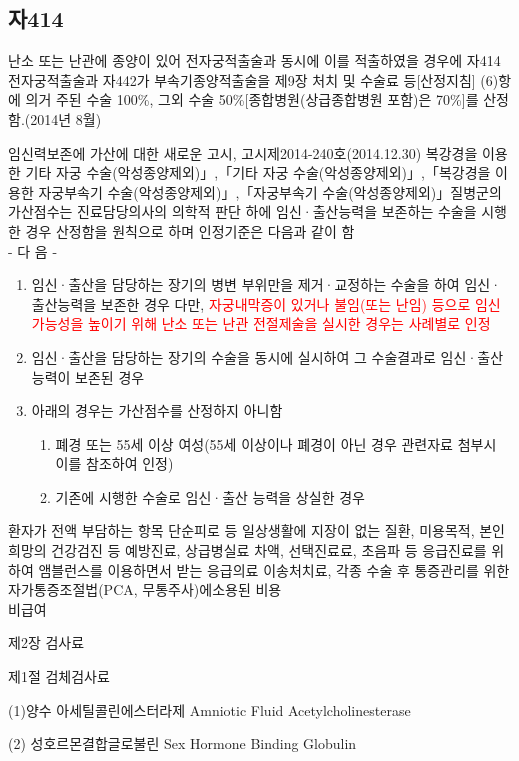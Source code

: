 \subsection{자414 }
\begin{mdframed}[linecolor=blue,middlelinewidth=2]
난소 또는 난관에 종양이 있어 전자궁적출술과 동시에 이를 적출하였을 경우에 자414 전자궁적출술과 자442가 부속기종양적출술을 제9장 처치 및 수술료 등[산정지침] (6)항에 의거 주된 수술 100\%, 그외 수술 50\%[종합병원(상급종합병원 포함)은 70\%]를 산정함.(2014년 8월)
\end{mdframed}

\begin{Cdoing}{임신력보존에 가산에 대한 새로운 고시, 고시제2014-240호(2014.12.30)}
복강경을 이용한 기타 자궁 수술(악성종양제외)」,「기타 자궁 수술(악성종양제외)」,「복강경을 이용한 자궁부속기 수술(악성종양제외)」,「자궁부속기 수술(악성종양제외)」질병군의 가산점수는 진료담당의사의 의학적 판단 하에 임신·출산능력을 보존하는 수술을 시행한 경우 산정함을 원칙으로 하며 인정기준은 다음과 같이 함 \\
- 다  음 - 
\begin{enumerate}[ 가.]\tightlist
\item  임신·출산을 담당하는 장기의 병변 부위만을 제거·교정하는 수술을 하여 임신·출산능력을 보존한 경우  다만, \textcolor{red}{자궁내막증이 있거나 불임(또는 난임) 등으로 임신가능성을 높이기 위해 난소 또는 난관 전절제술을 실시한 경우는 사례별로 인정}
\item 임신·출산을 담당하는 장기의 수술을 동시에 실시하여 그 수술결과로 임신·출산능력이 보존된 경우
\item 아래의 경우는 가산점수를 산정하지 아니함
	\begin{enumerate}[(1)]\tightlist
	\item  폐경 또는 55세 이상 여성(55세 이상이나 폐경이 아닌 경우 관련자료 첨부시 이를 참조하여 인정)
	\item  기존에 시행한 수술로 임신·출산 능력을 상실한 경우
	\end{enumerate}
\end{enumerate}	
\end{Cdoing}

\begin{hemphsentense}{환자가 전액 부담하는 항목}
단순피로 등 일상생활에 지장이 없는 질환, 미용목적, 본인희망의 건강검진 등 예방진료, 상급병실료 차액, 선택진료료, 초음파 등 
응급진료를 위하여 앰블런스를 이용하면서 받는 응급의료 이송처치료, 각종 수술 후 통증관리를 위한 자가통증조절법(PCA, 무통주사)에소용된 비용\\

비급여
  
제2장 검사료
  
제1절 검체검사료
  
(1)양수 아세틸콜린에스터라제 Amniotic Fluid Acetylcholinesterase
  
(2) 성호르몬결합글로불린 Sex Hormone Binding Globulin
\end{hemphsentense}  

